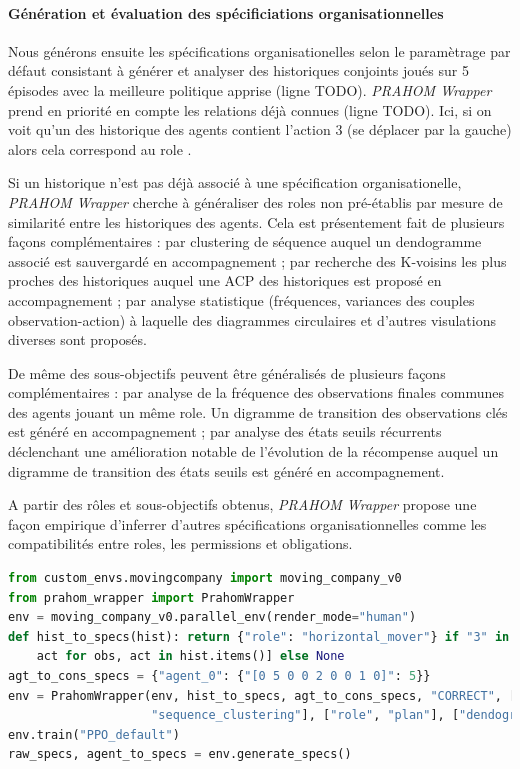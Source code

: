 \documentclass[demonstration]{jfsma}
\newcounter{relation}
\begin{document}
\paragraph{Génération et évaluation des spécificiations organisationnelles }

Nous générons ensuite les spécifications organisationelles selon le paramètrage par défaut consistant à générer et analyser des historiques conjoints joués sur 5 épisodes avec la meilleure politique apprise (ligne TODO).
\emph{PRAHOM Wrapper} prend en priorité en compte les relations déjà connues (ligne TODO). Ici, si on voit qu'un des historique des agents contient l'action $3$ (se déplacer par la gauche) alors cela correspond au role .

Si un historique n'est pas déjà associé à une spécification organisationelle, \emph{PRAHOM Wrapper} cherche à généraliser des roles non pré-établis par mesure de similarité entre les historiques des agents. Cela est présentement fait de plusieurs façons complémentaires : par clustering de séquence auquel un dendogramme associé est sauvergardé en accompagnement ; par recherche des K-voisins les plus proches des historiques auquel une ACP des historiques est proposé en accompagnement ; par analyse statistique (fréquences, variances des couples observation-action) à laquelle des diagrammes circulaires et d'autres visulations diverses sont proposés.

De même des sous-objectifs peuvent être généralisés de plusieurs façons complémentaires : par analyse de la fréquence des observations finales communes des agents jouant un même role. Un digramme de transition des observations clés est généré en accompagnement ; par analyse des états seuils récurrents déclenchant une amélioration notable de l'évolution de la récompense auquel un digramme de transition des états seuils est généré en accompagnement.

A partir des rôles et sous-objectifs obtenus, \emph{PRAHOM Wrapper} propose une façon empirique d'inferrer d'autres spécifications organisationnelles comme les compatibilités entre roles, les permissions et obligations.

\begin{lstlisting}[language=Python, caption={Utilisation synthétique de \emph{PRAHOM Wrapper} pour \emph{Moving Company}}, label={lst:wrapper_mc}]
from custom_envs.movingcompany import moving_company_v0
from prahom_wrapper import PrahomWrapper
env = moving_company_v0.parallel_env(render_mode="human")
def hist_to_specs(hist): return {"role": "horizontal_mover"} if "3" in [
    act for obs, act in hist.items()] else None
agt_to_cons_specs = {"agent_0": {"[0 5 0 0 2 0 0 1 0]": 5}}
env = PrahomWrapper(env, hist_to_specs, agt_to_cons_specs, "CORRECT", [
                    "sequence_clustering"], ["role", "plan"], ["dendogram", "PCA"])
env.train("PPO_default")
raw_specs, agent_to_specs = env.generate_specs()
\end{lstlisting}
\end{document}
